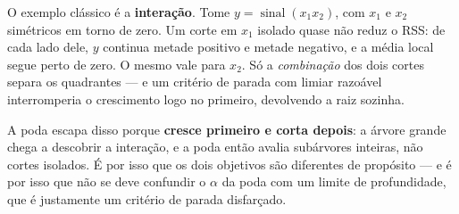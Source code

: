 \begin{solucao}
O exemplo clássico é a \textbf{interação}. Tome $y=\operatorname{sinal}(x_1x_2)$,
com $x_1$ e $x_2$ simétricos em torno de zero. Um corte em $x_1$ isolado quase não
reduz o RSS: de cada lado dele, $y$ continua metade positivo e metade negativo, e
a média local segue perto de zero. O mesmo vale para $x_2$. Só a \emph{combinação}
dos dois cortes separa os quadrantes --- e um critério de parada com limiar
razoável interromperia o crescimento logo no primeiro, devolvendo a raiz sozinha.

A poda escapa disso porque \textbf{cresce primeiro e corta depois}: a árvore
grande chega a descobrir a interação, e a poda então avalia subárvores inteiras,
não cortes isolados. É por isso que os dois objetivos são diferentes de propósito
--- e é por isso que não se deve confundir o $\alpha$ da poda com um limite de
profundidade, que é justamente um critério de parada disfarçado.
\end{solucao}

